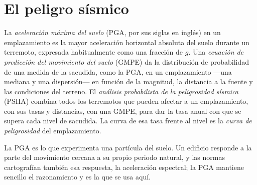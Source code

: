 \section{El peligro sísmico}\label{sec:b2:geological-hazards:seismic}

\begin{definition}\label{def:b2:geological-hazards:psha}
La \emph{aceleración máxima del suelo} (PGA, por sus siglas en inglés) en un emplazamiento es la mayor
aceleración horizontal absoluta del suelo durante un terremoto, expresada habitualmente como una
fracción de $g$. Una \emph{ecuación de predicción del movimiento del suelo}
(GMPE) da la distribución de probabilidad de una medida de la sacudida, como la PGA, en un
emplazamiento ---una mediana y una dispersión--- en función de la magnitud, la distancia a la fuente
y las condiciones del terreno. El \emph{análisis probabilista de la peligrosidad sísmica}
(PSHA) combina todos los terremotos que pueden afectar a un emplazamiento, con sus
tasas y distancias, con una GMPE, para dar la tasa anual con que se supera cada nivel de sacudida.
La curva de esa tasa frente al nivel es la \emph{curva de
peligrosidad} del emplazamiento.
\end{definition}

La PGA es lo que experimenta una partícula del suelo. Un edificio responde a la parte del
movimiento cercana a su propio periodo natural, y las normas cartografían también esa respuesta, la aceleración espectral;
la PGA mantiene sencillo el razonamiento y es la que se usa aquí.

